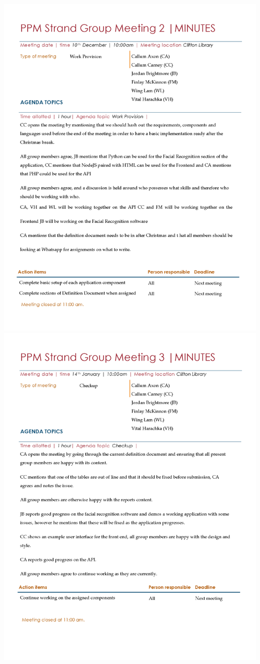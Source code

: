 \documentclass[
  english,
  a4paper,
,tablecaptionabove
]{scrartcl}
\begin{document}
\includegraphics{images/ppm-images/meeting-2.png} \newpage
\includegraphics{images/ppm-images/meeting-3.png} \newpage
\end{document}
